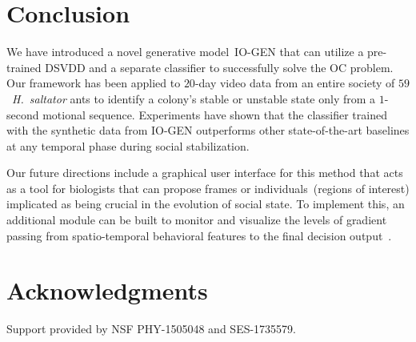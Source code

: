 \documentclass[letterpaper]{article} %
\begin{document}



\section{Conclusion}
\label{sec:conclusion}

We have introduced a novel generative model~\mbox{IO-GEN} that can utilize
a pre-trained DSVDD and a separate classifier to successfully
solve the OC problem. Our framework has been applied to $20$-day
video data from an entire society of $59$~\emph{H.~saltator} 
ants to identify a colony's stable or unstable state only from a 
$1$-second motional sequence. Experiments have shown that the 
classifier trained with the synthetic data from \mbox{IO-GEN} outperforms 
other state-of-the-art baselines at any temporal phase during social 
stabilization.

Our future directions include a graphical user interface for
this method that acts as a tool for biologists that can propose 
frames or individuals~(regions of interest) implicated 
as being crucial in the evolution of social state. 
To implement this, an additional module can be built to monitor and 
visualize the levels of gradient passing from spatio-temporal behavioral 
features to the final decision output~\citep{Choi2020PhDThesis}.

\section{Acknowledgments}
\label{sec:acknowledgements}

Support provided by NSF PHY-1505048 and SES-1735579.

 
\end{document}
